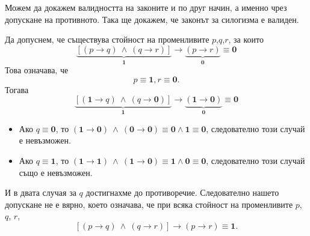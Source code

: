 \begin{example}
  Можем да докажем валидността на законите и по друг начин, а именно чрез допускане на противното.
  Така ще докажем, че законът за силогизма е валиден.
  
  Да допуснем, че съществува стойност на променливите $p$,$q$,$r$, за които
  \[\underbrace{[(p\rightarrow q)\ \wedge\ (q\rightarrow r)]}_{\mathbf{1}} \rightarrow \underbrace{(p\rightarrow r)}_{\mathbf{0}} \equiv {\mathbf 0}\]
  Това означава, че
  \[p \equiv \mathbf{1}, r \equiv \mathbf{0}.\]
  Тогава
  \[\underbrace{[(\mathbf{1}\rightarrow q)\ \wedge\ (q\rightarrow \mathbf{0})]}_{\mathbf{1}} \rightarrow \underbrace{(\mathbf{1}\rightarrow \mathbf{0})}_{\mathbf{0}} \equiv {\mathbf 0}\]
  \begin{itemize}
  \item 
    Ако $q \equiv \mathbf{0}$, то $(\mathbf{1}\rightarrow \mathbf{0})\ \wedge\ (\mathbf{0}\rightarrow \mathbf{0}) \equiv \mathbf{0} \wedge \mathbf{1} \equiv \mathbf{0}$,
    следователно този случай е невъзможен.
  \item
    Ако $q \equiv \mathbf{1}$, то $(\mathbf{1}\rightarrow \mathbf{1})\ \wedge\ (\mathbf{1}\rightarrow \mathbf{0}) \equiv \mathbf{1} \wedge \mathbf{0} \equiv \mathbf{0}$,
    следователно този случай също е невъзможен.
  \end{itemize}
  И в двата случая за $q$ достигнахме до противоречие.
  Следователно нашето допускане не е вярно, което означава, че
  при всяка стойност на променливите $p$, $q$, $r$,
  \[[(p\rightarrow q)\ \wedge\ (q\rightarrow r)] \rightarrow (p\rightarrow r) \equiv {\mathbf 1}.\]
\end{example}



